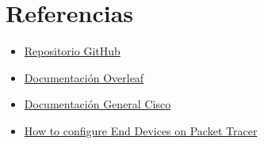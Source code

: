 \documentclass{article}
\begin{document}
    \pagebreak
    \section{Referencias}
        \begin{itemize}
            \item \href{https://github.com/MarianC312/Laboratorio_1_Hubs}{Repositorio GitHub}
            \item \href{https://www.overleaf.com/learn}{Documentación Overleaf}
            \item \href{https://community.cisco.com/t5/documentos-general/tkb-p/5761-docs-general}{Documentación General Cisco}
            \item \href{https://www.geeksforgeeks.org/how-to-configure-end-devices-on-packet-tracer/}{How to configure End Devices on Packet Tracer}
        \end{itemize}
\end{document}
